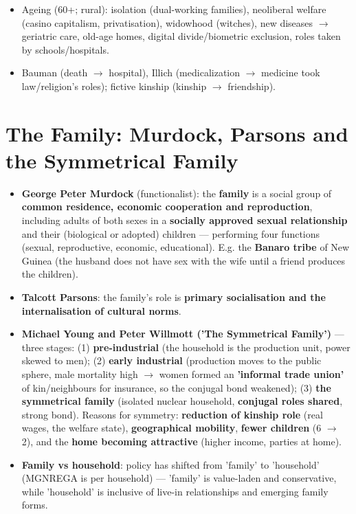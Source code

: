 \begin{QuickRevision}
\begin{itemize}
\item Ageing (60+; rural): isolation (dual-working families), neoliberal welfare (casino capitalism, privatisation), widowhood (witches), new diseases $\rightarrow$ geriatric care, old-age homes, digital divide/biometric exclusion, roles taken by schools/hospitals.
\item Bauman (death $\rightarrow$ hospital), Illich (medicalization $\rightarrow$ medicine took law/religion's roles); fictive kinship (kinship $\rightarrow$ friendship).
\end{itemize}
\end{QuickRevision}

\section{The Family: Murdock, Parsons and the Symmetrical Family}

\begin{KeyConcept}
\begin{itemize}
\item \textbf{George Peter Murdock} (functionalist): the \textbf{family} is a social group of \textbf{common residence, economic cooperation and reproduction}, including adults of both sexes in a \textbf{socially approved sexual relationship} and their (biological or adopted) children --- performing four functions (sexual, reproductive, economic, educational). E.g. the \textbf{Banaro tribe} of New Guinea (the husband does not have sex with the wife until a friend produces the children).
\item \textbf{Talcott Parsons}: the family's role is \textbf{primary socialisation and the internalisation of cultural norms}.
\item \textbf{Michael Young and Peter Willmott ('The Symmetrical Family')} --- three stages: (1) \textbf{pre-industrial} (the household is the production unit, power skewed to men); (2) \textbf{early industrial} (production moves to the public sphere, male mortality high $\rightarrow$ women formed an \textbf{'informal trade union'} of kin/neighbours for insurance, so the conjugal bond weakened); (3) \textbf{the symmetrical family} (isolated nuclear household, \textbf{conjugal roles shared}, strong bond). Reasons for symmetry: \textbf{reduction of kinship role} (real wages, the welfare state), \textbf{geographical mobility}, \textbf{fewer children} (6 $\rightarrow$ 2), and the \textbf{home becoming attractive} (higher income, parties at home).
\item \textbf{Family vs household}: policy has shifted from 'family' to 'household' (MGNREGA is per household) --- 'family' is value-laden and conservative, while 'household' is inclusive of live-in relationships and emerging family forms.
\end{itemize}
\end{KeyConcept}

